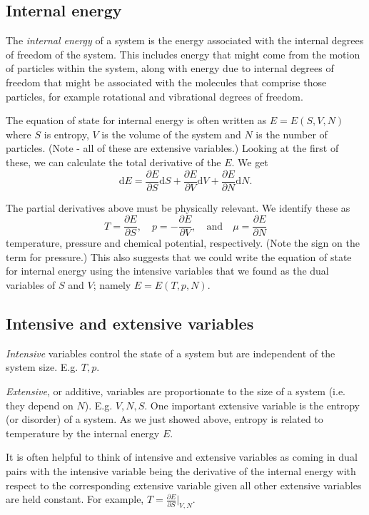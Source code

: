 \subsection{Internal energy}
The \emph{internal energy} of a system is the energy associated with the internal degrees of freedom of the system. This includes energy that might come from the motion of particles within the system, along with energy due to internal degrees of freedom that might be associated with the molecules that comprise those particles, for example rotational and vibrational degrees of freedom. 

The equation of state for internal energy is often written as $E = E(S,V,N)$ where $S$ is entropy, $V$ is the volume of the system and $N$ is the number of particles. (Note - all of these are extensive variables.)
Looking at the first of these, we can calculate the total derivative of the $E$. We get
$$
	\mathrm{d}E = \frac{\partial E}{\partial S}\mathrm{d}S +  \frac{\partial E}{\partial V}\mathrm{d}V +  \frac{\partial E}{\partial N}\mathrm{d}N.  
$$

The partial derivatives above must be physically relevant. We identify these as 
$$T =  \frac{\partial E}{\partial S}, \quad p = -\frac{\partial E}{\partial V},\quad \mbox{and}  \quad \mu = \frac{\partial E}{\partial N}$$ 
temperature, pressure and chemical potential, respectively. (Note the sign on the term for pressure.) This also suggests that we could write the equation of state for internal energy using the intensive variables that we found as the dual variables of $S$ and $V$; namely $E = E(T,p,N)$.

\subsection{Intensive and extensive variables}

\emph{Intensive} variables control the state of a system but are independent of the system size. E.g. $T,p$.

\emph{Extensive}, or additive, variables are proportionate to the size of a system (i.e. they depend on $N$). E.g. $V,N,S$.
One important extensive variable is the entropy (or disorder) of a system. As we just showed above, entropy is related to temperature by the internal energy $E$.

It is often helpful to think of intensive and extensive variables as coming in dual pairs with the intensive variable being the derivative of the internal energy with respect to the corresponding extensive variable given all other extensive variables are held constant. For example, $T = \frac{\partial E}{\partial S}\vert_{V,N}$.

